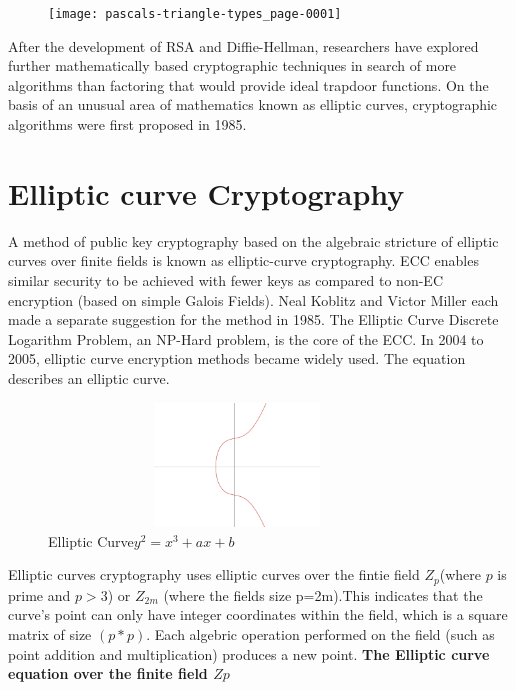 \documentclass{article}
\begin{document}
\begin{figure}[h]
\texttt{[image: pascals-triangle-types\_page-0001]}
\centering
\end{figure}
After the development of RSA and Diffie-Hellman, researchers have explored further mathematically based cryptographic techniques in search of more algorithms than factoring that would provide ideal trapdoor functions. On the basis of an unusual area of mathematics known as elliptic curves, cryptographic algorithms were first proposed in 1985.
\newpage
\section{Elliptic curve Cryptography}
A method of public key cryptography based on the algebraic stricture of elliptic curves over finite fields is known as elliptic-curve cryptography. ECC enables similar security to be achieved with fewer keys as compared to non-EC encryption (based on simple Galois Fields). Neal Koblitz and Victor Miller each made a separate suggestion for the method in 1985. The Elliptic Curve Discrete Logarithm Problem, an NP-Hard problem, is the core of the ECC. In 2004 to 2005, elliptic curve encryption methods became widely used.
The equation describes an elliptic curve.
\begin{center}
  \end{center}

\begin{figure}[h]
\includegraphics[width=10cm, height=3.3cm]{ECC.png}
 \caption{Elliptic Curve\:\(y^2=x^3+ax+b\)}
\centering
\end{figure}

Elliptic curves cryptography uses elliptic curves over the fintie field \(Z_{p}\)(where \(p\) is prime and \(p>3\)) or \(Z_{2m}\) (where the fields size p=2m).This indicates that the curve's point can only have integer coordinates within the field, which is a square matrix of size \((p*p)\). Each algebric operation performed on the field (such as point addition and multiplication) produces a new point.
\textbf{The Elliptic curve equation over the finite field \(Zp\)}
\end{document}
